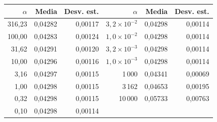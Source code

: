 \begin{tabular}{rrr@{\hspace{1cm}}rrr}
\toprule
$\alpha$ & Media & Desv. est. & $\alpha$ & Media & Desv. est. \\
\midrule
316{,}23 & 0{,}04282 & 0{,}00117 & $3{,}2\times10^{-2}$ & 0{,}04298 & 0{,}00114 \\
100{,}00 & 0{,}04283 & 0{,}00124 & $1{,}0\times10^{-2}$ & 0{,}04298 & 0{,}00114 \\
31{,}62 & 0{,}04291 & 0{,}00120 & $3{,}2\times10^{-3}$ & 0{,}04298 & 0{,}00114 \\
10{,}00 & 0{,}04296 & 0{,}00116 & $1{,}0\times10^{-3}$ & 0{,}04298 & 0{,}00114 \\
3{,}16 & 0{,}04297 & 0{,}00115 & 1\,000 & 0{,}04341 & 0{,}00069 \\
1{,}00 & 0{,}04298 & 0{,}00115 & 3\,162 & 0{,}04653 & 0{,}00195 \\
0{,}32 & 0{,}04298 & 0{,}00115 & 10\,000 & 0{,}05733 & 0{,}00763 \\
0{,}10 & 0{,}04298 & 0{,}00114 &  &  &  \\
\bottomrule
\end{tabular}